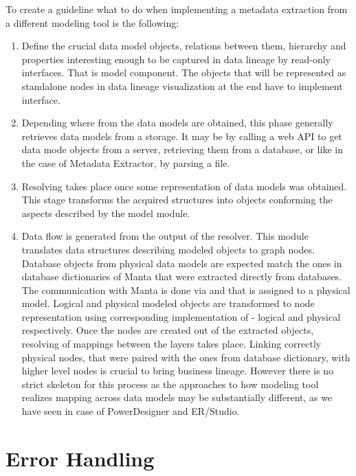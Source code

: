 To create a guideline what to do when implementing a metadata extraction from a different modeling tool is the following:

\begin{enumerate}
	\item Define the crucial data model objects, relations between them, hierarchy and properties interesting enough to be captured in data lineage by read-only interfaces. That is model component. 
	The objects that will be represented as standalone nodes in data lineage visualization at the end have to implement  interface.
	\item Depending where from the data models are obtained, this phase generally retrieves data models from a storage. It may be by calling a web API to get data mode objects from a server, retrieving them from a database, or like in the case of Metadata Extractor, by parsing a file.
	\item Resolving takes place once some representation of data models was obtained. This stage transforms the acquired structures into objects conforming the aspects described by the model module.
	\item Data flow is generated from the output of the resolver. This module translates data structures describing modeled objects to graph nodes. 
	Database objects from physical data models are expected match the ones in database dictionaries of Manta that were extracted directly from databases. 
	The communication with Manta is done via  and  that is assigned to a physical model.
	Logical and physical modeled objects are transformed to node representation using corresponding implementation of  - logical and physical respectively.
	Once the nodes are created out of the extracted objects, resolving of mappings between the layers takes place.
	Linking correctly physical nodes, that were paired with the ones from database dictionary, with higher level nodes is crucial to bring business lineage. 
	However there is no strict skeleton for this process as the approaches to how modeling tool realizes mapping across data models may be substantially different, as we have seen in case of PowerDesigner and ER/Studio.
\end{enumerate} 

\section{Error Handling}

